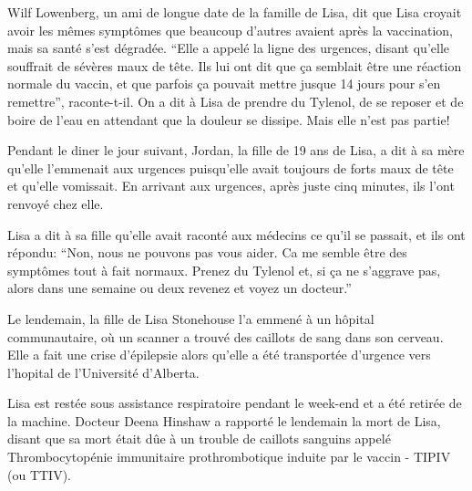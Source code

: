 Wilf Lowenberg, un ami de longue date de la famille de Lisa, dit que Lisa
croyait avoir les mêmes symptômes que beaucoup d'autres avaient après la
vaccination, mais sa santé s'est dégradée. “Elle a appelé la ligne des urgences,
disant qu'elle souffrait de sévères maux de tête. Ils lui ont dit que ça
semblait être une réaction normale du vaccin, et que parfois ça pouvait mettre
jusque 14 jours pour s'en remettre”, raconte-t-il. On a dit à Lisa de prendre du
Tylenol, de se reposer et de boire de l'eau en attendant que la douleur se
dissipe. Mais elle n'est pas partie!

Pendant le diner le jour suivant, Jordan, la fille de 19 ans de Lisa, a dit à sa
mère qu'elle l'emmenait aux urgences puisqu'elle avait toujours de forts maux de
tête et qu'elle vomissait. En arrivant aux urgences, après juste cinq minutes,
ils l'ont renvoyé chez elle.

Lisa a dit à sa fille qu'elle avait raconté aux médecins ce qu'il se passait, et
ils ont répondu: “Non, nous ne pouvons pas vous aider. Ca me semble être des
symptômes tout à fait normaux. Prenez du Tylenol et, si ça ne s'aggrave pas,
alors dans une semaine ou deux revenez et voyez un docteur.”

Le lendemain, la fille de Lisa Stonehouse l'a emmené à un hôpital communautaire,
où un scanner a trouvé des caillots de sang dans son cerveau. Elle a fait une
crise d'épilepsie alors qu'elle a été transportée d'urgence vers l'hopital de
l'Université d'Alberta.

Lisa est restée sous assistance respiratoire pendant le week-end et a été
retirée de la machine. Docteur Deena Hinshaw a rapporté le lendemain la mort de
Lisa, disant que sa mort était dûe à un trouble de caillots sanguins appelé
Thrombocytopénie immunitaire prothrombotique induite par le vaccin - TIPIV (ou
TTIV).
